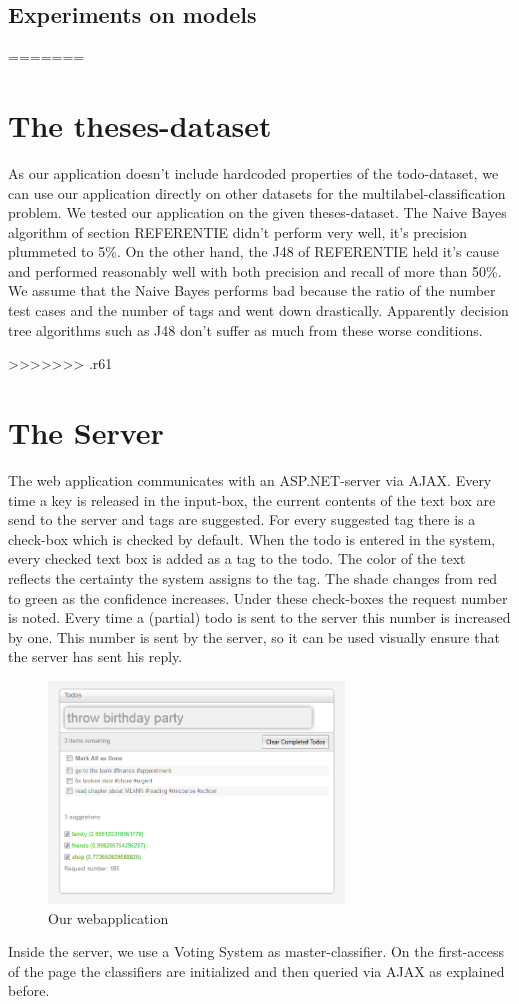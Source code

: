 \documentclass[a4paper,titlepage]{article}
\begin{document}
\subsection{Experiments on models}

=======

\section{The theses-dataset}
As our application doesn't include hardcoded properties of the todo-dataset, we can use our application directly on other datasets for the multilabel-classification problem. We tested our application on the given theses-dataset. The Naive Bayes algorithm of section REFERENTIE didn't perform very well, it's precision plummeted to 5\%. On the other hand, the J48 of REFERENTIE held it's cause and performed reasonably well with both precision and recall of more than 50\%. 
We assume that the Naive Bayes performs bad because the ratio of  the number test cases  and the number of tags and went down drastically. Apparently decision tree algorithms such as J48 don't suffer as much from these worse conditions. 

>>>>>>> .r61
\section{The Server}
The web application communicates with an ASP.NET-server via AJAX. Every time a key is released in the input-box, the current contents of the text box are send to the server and tags are suggested. For every suggested tag there is a check-box which is checked by default. 
When the todo is entered in the system, every checked text box is added as a tag to the todo. The color of the text reflects the certainty the system assigns to the tag. The shade changes from red to green as the confidence increases. Under these check-boxes the request number is noted. Every time a (partial) todo is sent to the server this number is increased by one. This number is sent by the server, so it can be used visually ensure that the server has sent his reply.
\begin{figure} \centering \includegraphics[width=0.70\textwidth]{screenshot.PNG} \caption{Our webapplication} \end{figure}
Inside the server, we use a Voting System as master-classifier. On the first-access of the page the classifiers are initialized and then queried via AJAX as explained before. 
\end{document}
